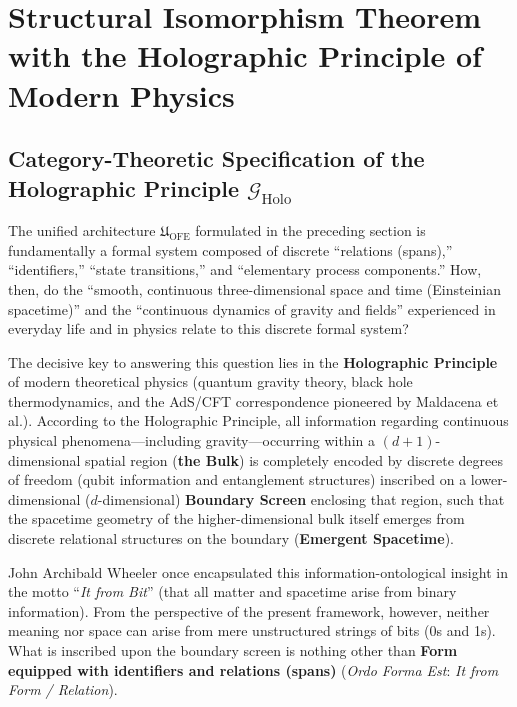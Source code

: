 \documentclass[11pt,a4paper]{article}
\theoremstyle{definition}
\theoremstyle{plain}
\begin{document}
\section{Structural Isomorphism Theorem with the Holographic Principle of Modern Physics}

\subsection{Category-Theoretic Specification of the Holographic Principle $\mathcal{G}_{\mathrm{Holo}}$}
The unified architecture $\mathfrak{U}_{\mathrm{OFE}}$ formulated in the preceding section is fundamentally a formal system composed of discrete ``relations (spans),'' ``identifiers,'' ``state transitions,'' and ``elementary process components.'' How, then, do the ``smooth, continuous three-dimensional space and time (Einsteinian spacetime)'' and the ``continuous dynamics of gravity and fields'' experienced in everyday life and in physics relate to this discrete formal system?

The decisive key to answering this question lies in the \textbf{Holographic Principle} of modern theoretical physics (quantum gravity theory, black hole thermodynamics, and the AdS/CFT correspondence pioneered by Maldacena et al.). According to the Holographic Principle, all information regarding continuous physical phenomena---including gravity---occurring within a $(d+1)$-dimensional spatial region (\textbf{the Bulk}) is completely encoded by discrete degrees of freedom (qubit information and entanglement structures) inscribed on a lower-dimensional ($d$-dimensional) \textbf{Boundary Screen} enclosing that region, such that the spacetime geometry of the higher-dimensional bulk itself emerges from discrete relational structures on the boundary (\textbf{Emergent Spacetime}).

John Archibald Wheeler once encapsulated this information-ontological insight in the motto ``\textit{It from Bit}'' (that all matter and spacetime arise from binary information). From the perspective of the present framework, however, neither meaning nor space can arise from mere unstructured strings of bits (0s and 1s). What is inscribed upon the boundary screen is nothing other than \textbf{Form equipped with identifiers and relations (spans)} (\textit{Ordo Forma Est}: \textit{It from Form / Relation}).
\end{document}
